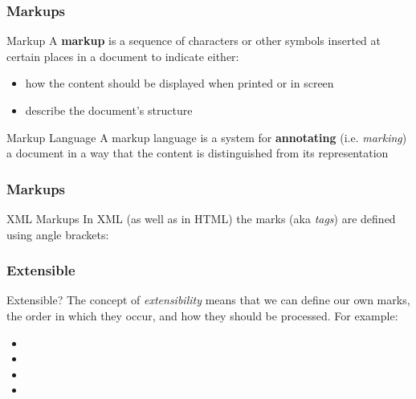 \documentclass{beamer}\usepackage[]{graphicx}\usepackage[]{color}
\begin{document}
\begin{frame}
\frametitle{Markups}

\begin{block}{Markup}
A \textbf{markup} is a sequence of characters or other symbols inserted at certain places in a document to indicate either: 
\begin{itemize}
 \item how the content should be displayed when printed or in screen
 \item describe the document's structure
\end{itemize}
\end{block}

\begin{block}{Markup Language}
A markup language is a system for \textbf{annotating} (i.e. \textit{marking}) a document in a way that the content is distinguished from its representation 
\end{block}

\end{frame}


\begin{frame}[fragile]
\frametitle{Markups}

\begin{block}{XML Markups}
In XML (as well as in HTML) the marks (aka \textit{tags}) are defined using angle brackets: {\Huge \highcode{<>}}
\end{block}

\bigskip


\end{frame}


\begin{frame}[fragile]
\frametitle{Extensible}

\begin{block}{Extensible?}
The concept of \textit{extensibility} means that we can define our own marks, the order in which they occur, and how they should be processed. For example:
 \begin{itemize}
  \item {}
  \item {}
  \item {}
  \item {}
 \end{itemize}
\end{block}

\end{frame}
\end{document}
